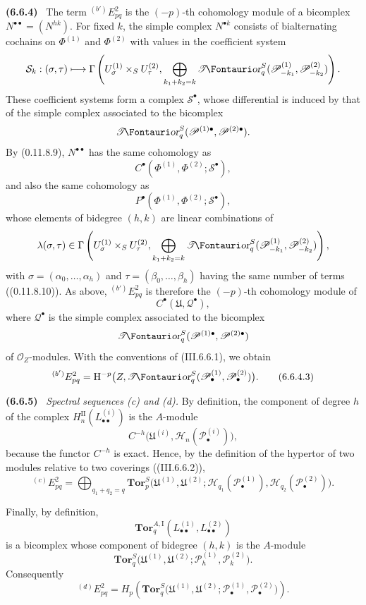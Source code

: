 \documentclass[10pt,oneside]{book}
\newcommand{\sh}[1]{\mathscr{#1}}
\newcommand{\shTor}{\sh{T}\textup{\kern-2.2pt{\Fontauri\slshape or}}}
\newcommand{\HH}{\mathrm H}
\newcommand{\sref}[2][]{(#2)}
\newcommand{\oldpage}[2][]{\setcounter{footnote}{0}\marginpar{\scriptsize\textbf{#1}~|~#2}\ignorespaces}
\newenvironment{env}[1][]{\par\medskip\noindent\textbf{(#1)}\ }{\par}
\begin{document}
\begin{env}[6.6.4]
The term ${}^{(b')}E_{pq}^2$ is the $(-p)$-th cohomology module
of a bicomplex $N^{\bullet\bullet}=(N^{hk})$.  For fixed $k$,
the simple complex $N^{\bullet k}$ consists of bialternating
cochains on $\Phi^{(1)}$ and $\Phi^{(2)}$ with values in the
coefficient system
\[
  \mathcal S_k:(\sigma,\tau)\longmapsto
  \Gamma\left(
    U_\sigma^{(1)}\times_SU_\tau^{(2)},
    \bigoplus_{k_1+k_2=k}
    \shTor_q^S(\sh P_{-k_1}^{(1)},\sh P_{-k_2}^{(2)})
  \right).
\]
These coefficient systems form a complex
$\mathcal S^\bullet$, whose differential is induced by that of
the simple complex associated to the bicomplex
\[
  \shTor_q^S
  (\sh P^{(1)\bullet},\sh P^{(2)\bullet}).
\]
By \sref[0]{0.11.8.9}, $N^{\bullet\bullet}$ has the same
cohomology as
\[
  C^\bullet
  (\Phi^{(1)},\Phi^{(2)};\mathcal S^\bullet),
\]
and also the same cohomology as
\[
  P^\bullet
  (\Phi^{(1)},\Phi^{(2)};\mathcal S^\bullet),
\]
whose elements of bidegree $(h,k)$ are linear combinations of
\[
  \lambda(\sigma,\tau)\in
  \Gamma\left(
    U_\sigma^{(1)}\times_SU_\tau^{(2)},
    \bigoplus_{k_1+k_2=k}
    \shTor_q^S(\sh P_{-k_1}^{(1)},\sh P_{-k_2}^{(2)})
  \right),
\]
with $\sigma=(\alpha_0,\ldots,\alpha_h)$ and
$\tau=(\beta_0,\ldots,\beta_h)$ having the same number of terms
(\sref[0]{0.11.8.10}).  As above, ${}^{(b')}E_{pq}^2$ is
therefore the $(-p)$-th cohomology module of
\[
  C^\bullet(\mathfrak U,\mathcal Q^\bullet),
\]
where $\mathcal Q^\bullet$ is the simple complex associated to
the bicomplex
\[
  \shTor_q^S
  (\sh P^{(1)\bullet},\sh P^{(2)\bullet})
\]
of $\sh O_Z$-modules.  With the conventions of
\sref{III.6.6.1}, we obtain
\[
  {}^{(b')}E_{pq}^2
  =
  \HH^{-p}
  \bigl(
    Z,\shTor_q^S
    (\sh P_\bullet^{(1)},\sh P_\bullet^{(2)})
  \bigr).
  \tag{6.6.4.3}\label{III.6.6.4.3}
\]
\end{env}

\oldpage[III]{156}

\begin{env}[6.6.5]
\label{III.6.6.5}
\emph{Spectral sequences \textnormal{(c)} and
\textnormal{(d)}.}
By definition, the component of degree $h$ of the complex
$H_n^{\mathrm{II}}(L_{\bullet\bullet}^{(i)})$ is the
$A$-module
\[
  C^{-h}
  \bigl(
    \mathfrak U^{(i)},
    \sh H_n(\sh P_\bullet^{(i)})
  \bigr),
\]
because the functor $C^{-h}$ is exact.  Hence, by the definition
of the hypertor of two modules relative to two coverings
(\sref{III.6.6.2}),
\[
  {}^{(c)}E_{pq}^2
  =
  \bigoplus_{q_1+q_2=q}
  \mathbf{Tor}_p^S
  \bigl(
    \mathfrak U^{(1)},\mathfrak U^{(2)};
    \sh H_{q_1}(\sh P_\bullet^{(1)}),
    \sh H_{q_2}(\sh P_\bullet^{(2)})
  \bigr).
\]

Finally, by definition,
\[
  \mathbf{Tor}_q^{A,\mathrm I}
  (L_{\bullet\bullet}^{(1)},L_{\bullet\bullet}^{(2)})
\]
is a bicomplex whose component of bidegree $(h,k)$ is the
$A$-module
\[
  \mathbf{Tor}_q^S
  \bigl(
    \mathfrak U^{(1)},\mathfrak U^{(2)};
    \sh P_h^{(1)},\sh P_k^{(2)}
  \bigr).
\]
Consequently
\[
  {}^{(d)}E_{pq}^2
  =
  H_p\left(
    \mathbf{Tor}_q^S
    \bigl(
      \mathfrak U^{(1)},\mathfrak U^{(2)};
      \sh P_\bullet^{(1)},\sh P_\bullet^{(2)}
    \bigr)
  \right).
\]
\end{env}
\end{document}

